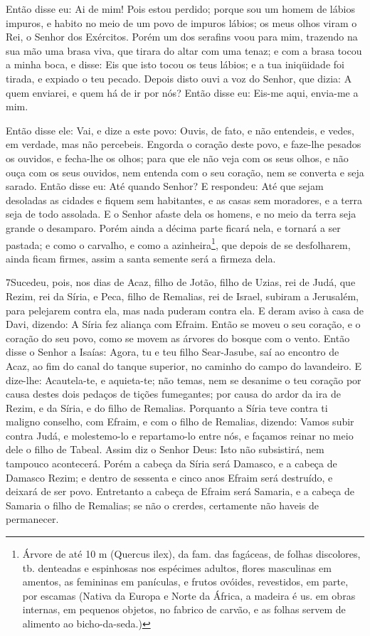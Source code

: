 Então disse eu: Ai de mim! Pois estou perdido; porque sou um homem
de lábios impuros, e habito no meio de um povo de impuros lábios; os
meus olhos viram o Rei, o Senhor dos Exércitos. Porém um dos
serafins voou para mim, trazendo na sua mão uma brasa viva, que
tirara do altar com uma tenaz; e com a brasa tocou a minha boca,
e disse: Eis que isto tocou os teus lábios; e a tua iniqüidade foi
tirada, e expiado o teu pecado. Depois disto ouvi a voz do
Senhor, que dizia: A quem enviarei, e quem há de ir por nós? Então
disse eu: Eis-me aqui, envia-me a mim.

Então disse ele: Vai, e dize a este povo: Ouvis, de fato, e não
entendeis, e vedes, em verdade, mas não percebeis. Engorda o
coração deste povo, e faze-lhe pesados os ouvidos, e fecha-lhe os
olhos; para que ele não veja com os seus olhos, e não ouça com os
seus ouvidos, nem entenda com o seu coração, nem se converta e seja
sarado. Então disse eu: Até quando Senhor? E respondeu: Até
que sejam desoladas as cidades e fiquem sem habitantes, e as casas
sem moradores, e a terra seja de todo assolada. E o Senhor
afaste dela os homens, e no meio da terra seja grande o desamparo.
Porém ainda a décima parte ficará nela, e tornará a ser
pastada; e como o carvalho, e como a azinheira\footnote{Árvore de
até 10 m (Quercus ilex), da fam. das fagáceas, de folhas discolores,
tb. denteadas e espinhosas nos espécimes adultos, flores masculinas
em amentos, as femininas em panículas, e frutos ovóides, revestidos,
em parte, por escamas (Nativa da Europa e Norte da África, a madeira
é us. em obras internas, em pequenos objetos, no fabrico de carvão,
e as folhas servem de alimento ao bicho-da-seda.)}, que depois de se
desfolharem, ainda ficam firmes, assim a santa semente será a
firmeza dela.

\medskip

\lettrine{7}{}Sucedeu, pois, nos dias de Acaz, filho de Jotão,
filho de Uzias, rei de Judá, que Rezim, rei da Síria, e Peca, filho
de Remalias, rei de Israel, subiram a Jerusalém, para pelejarem
contra ela, mas nada puderam contra ela. E deram aviso à casa de
Davi, dizendo: A Síria fez aliança com Efraim. Então se moveu o seu
coração, e o coração do seu povo, como se movem as árvores do bosque
com o vento. Então disse o Senhor a Isaías: Agora, tu e teu
filho Sear-Jasube, saí ao encontro de Acaz, ao fim do canal do
tanque superior, no caminho do campo do lavandeiro. E dize-lhe:
Acautela-te, e aquieta-te; não temas, nem se desanime o teu coração
por causa destes dois pedaços de tições fumegantes; por causa do
ardor da ira de Rezim, e da Síria, e do filho de Remalias.
Porquanto a Síria teve contra ti maligno conselho, com Efraim, e
com o filho de Remalias, dizendo: Vamos subir contra Judá, e
molestemo-lo e repartamo-lo entre nós, e façamos reinar no meio dele
o filho de Tabeal. Assim diz o Senhor Deus: Isto não subsistirá,
nem tampouco acontecerá. Porém a cabeça da Síria será Damasco, e
a cabeça de Damasco Rezim; e dentro de sessenta e cinco anos Efraim
será destruído, e deixará de ser povo. Entretanto a cabeça de
Efraim será Samaria, e a cabeça de Samaria o filho de Remalias; se
não o crerdes, certamente não haveis de permanecer.

